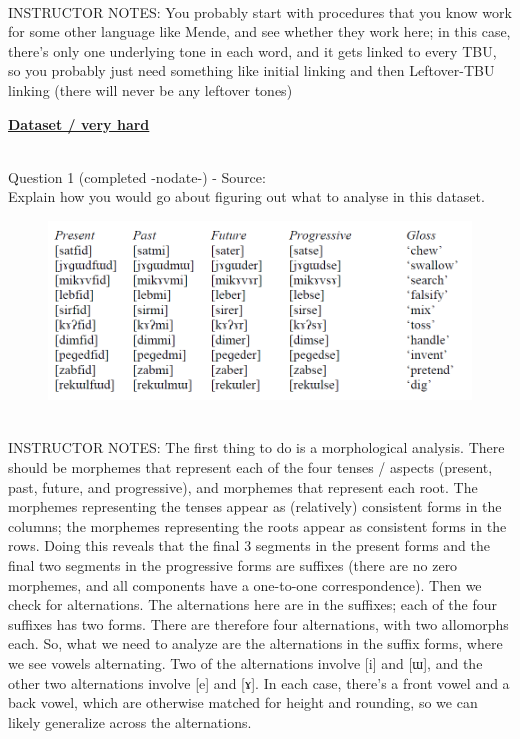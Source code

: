 \documentclass[12pt]{article}
\begin{document}
~\\
INSTRUCTOR NOTES: You probably start with procedures that you know work for some other language like Mende, and see whether they work here; in this case, there's only one underlying tone in each word, and it gets linked to every TBU, so you probably just need something like initial linking and then Leftover-TBU linking (there will never be any leftover tones)


\newpage\textbf{\underline{\huge Dataset / very hard\\}}

~\\

{\large Question 1} (completed -nodate-) - Source: \\

Explain how you would go about figuring out what to analyse in this dataset.\\

\begin{figure}[H]
\includegraphics{../images/final_dataset.png}
\end{figure}

~\\
INSTRUCTOR NOTES: The first thing to do is a morphological analysis. There should be morphemes that represent each of the four tenses / aspects (present, past, future, and progressive), and morphemes that represent each root. The morphemes representing the tenses appear as (relatively) consistent forms in the columns; the morphemes representing the roots appear as consistent forms in the rows. Doing this reveals that the final 3 segments in the present forms and the final two segments in the progressive forms are suffixes (there are no zero morphemes, and all components have a one-to-one correspondence). Then we check for alternations. The alternations here are in the suffixes; each of the four suffixes has two forms. There are therefore four alternations, with two allomorphs each. So, what we need to analyze are the alternations in the suffix forms, where we see vowels alternating. Two of the alternations involve [i] and [ɯ], and the other two alternations involve [e] and [ɤ]. In each case, there’s a front vowel and a back vowel, which are otherwise matched for height and rounding, so we can likely generalize across the alternations.
\end{document}
